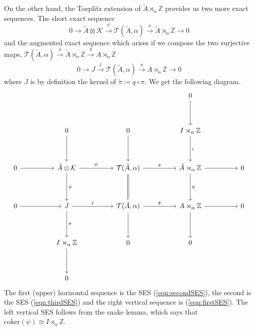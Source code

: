 \documentclass[11pt]{amsart}
\newcommand{\Z}{\mathbb{Z}}
\renewcommand{\b}{\psi}
\begin{document}
On the other hand, the Toeplitz extension of $\tilde{A}\rtimes_\alpha \Z $ provides us two more exact sequences. 
The short exact sequence
\begin{equation}\label{eqn:secondSES}
	0 \rightarrow \tilde{A} \otimes \mathcal{K} \xrightarrow{\b} \mathcal{T}(\tilde{A}, \alpha) \xrightarrow{\pi} \tilde{A} \rtimes_\alpha \mathbb{Z} \rightarrow 0
\end{equation}
and the augmented exact sequence which arises if we
compose the two surjective maps, $\mathcal{T}(\tilde{A}, \alpha) \stackrel{\pi}\rightarrow \tilde{A}\rtimes_\alpha \Z \stackrel{q}\rightarrow A\rtimes_\alpha \Z $
\begin{equation}\label{eqn:thirdSES}
	0 \rightarrow J \xrightarrow{j} \mathcal{T}(\tilde{A}, \alpha) \xrightarrow{\tilde{\pi}} A \rtimes_\alpha \mathbb{Z} \rightarrow 0
\end{equation}
where $J$ is by definition the kernel of $\tilde{\pi}\coloneqq q \circ \pi$. 
We get the following diagram. 
\begin{equation}\label{eqn:diagram}
	\begin{tikzcd}
		&&&&&& 0 \\
		\\
		&& 0 && 0 && {I \rtimes_\alpha \mathbb{Z}} \\
		\\
		0 && {\tilde{A} \otimes \mathcal{K}} && {\mathcal{T}(\tilde{A}, \alpha)} && {\tilde{A} \rtimes_\alpha \mathbb{Z}} && 0 \\
		&&&&  \\
		0 && J && {\mathcal{T}(\tilde{A}, \alpha)} && {A \rtimes_\alpha \mathbb{Z}} && 0 \\
		\\
		&& {I \rtimes_\alpha \mathbb{Z}} && {0} && 0 \\
		\\
		&& 0
		\arrow[from=1-7, to=3-7]
		\arrow[from=3-3, to=5-3]
		\arrow[from=3-5, to=5-5]
		\arrow["i", from=3-7, to=5-7]
		\arrow[from=5-1, to=5-3]
		\arrow["\b", from=5-3, to=5-5]
		\arrow["\b", from=5-3, to=7-3]
		\arrow["\pi", from=5-5, to=5-7]
		\arrow[from=5-7, to=5-9]
		\arrow["q", from=5-7, to=7-7]
		\arrow[from=7-1, to=7-3]
		\arrow["j", from=7-3, to=7-5]
		\arrow["\pi", from=7-3, to=9-3]
		\arrow["{\tilde{\pi}}", from=7-5, to=7-7]
		\arrow[from=7-5, to=9-5]
		\arrow[from=7-7, to=7-9]
		\arrow[from=7-7, to=9-7]
		\arrow[from=9-3, to=11-3]
		\arrow[equal, from=5-5, to=7-5]
	\end{tikzcd}
\end{equation}
The first (upper) horizontal sequence is the SES (\ref{eqn:secondSES}), the second is the SES (\ref{eqn:thirdSES}) and the right vertical sequence is (\ref{eqn:firstSES}). 
The left vertical SES follows from the snake lemma, which says that $\mathrm{coker}(\b)\cong I \rtimes_\alpha \mathbb{Z}$. 
\end{document}
